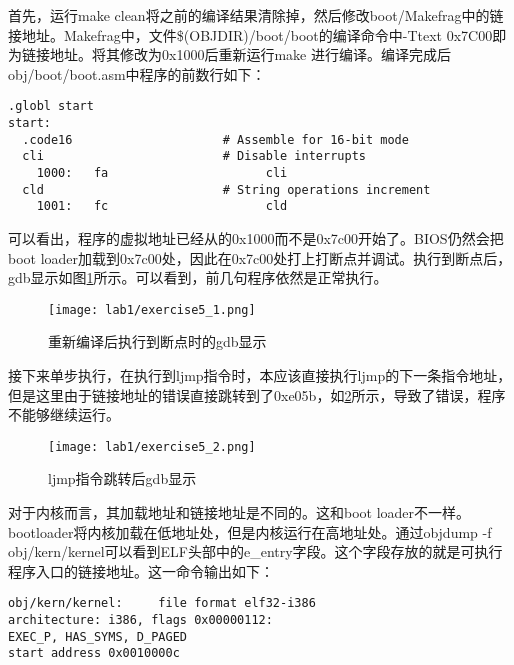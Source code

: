 
\begin{exerciseSolution}{5}
\par 首先，运行make clean将之前的编译结果清除掉，然后修改boot/Makefrag中的链接地址。Makefrag中，文件\$(OBJDIR)/boot/boot的编译命令中-Ttext 0x7C00即为链接地址。将其修改为0x1000后重新运行make 进行编译。编译完成后obj/boot/boot.asm中程序的前数行如下：
\begin{lstlisting}
.globl start
start:
  .code16                     # Assemble for 16-bit mode
  cli                         # Disable interrupts
    1000:	fa                   	cli
  cld                         # String operations increment
    1001:	fc                   	cld
\end{lstlisting}
\par 可以看出，程序的虚拟地址已经从的0x1000而不是0x7c00开始了。BIOS仍然会把boot loader加载到0x7c00处，因此在0x7c00处打上打断点并调试。执行到断点后，gdb显示如图\ref{fig:exercise5_1}所示。可以看到，前几句程序依然是正常执行。
\begin{figure}[htb]
    \centering
    \texttt{[image: lab1/exercise5\_1.png]}
    \caption{重新编译后执行到断点时的gdb显示}
    \label{fig:exercise5_1}
\end{figure}
\par 接下来单步执行，在执行到ljmp指令时，本应该直接执行ljmp的下一条指令地址，但是这里由于链接地址的错误直接跳转到了0xe05b，如\ref{fig:exercise5_2}所示，导致了错误，程序不能够继续运行。
\begin{figure}[htb]
    \centering
    \texttt{[image: lab1/exercise5\_2.png]}
    \caption{ljmp指令跳转后gdb显示}
    \label{fig:exercise5_2}
\end{figure}
\end{exerciseSolution}

\par 对于内核而言，其加载地址和链接地址是不同的。这和boot loader不一样。bootloader将内核加载在低地址处，但是内核运行在高地址处。通过objdump -f obj/kern/kernel可以看到ELF头部中的e\_entry字段。这个字段存放的就是可执行程序入口的链接地址。这一命令输出如下：
\begin{lstlisting}[numbers=none]
obj/kern/kernel:     file format elf32-i386
architecture: i386, flags 0x00000112:
EXEC_P, HAS_SYMS, D_PAGED
start address 0x0010000c
\end{lstlisting}

